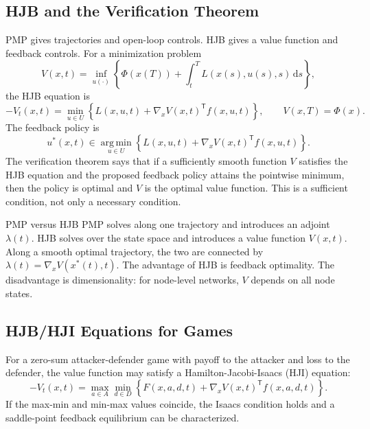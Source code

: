 \documentclass[11pt,a4paper]{article}
\newcommand{\dd}{\,\mathrm{d}}
\newcommand{\argmin}{\operatorname*{arg\,min}}
\newcommand{\T}{\mathsf{T}}
\begin{document}
\subsection{HJB and the Verification Theorem}

PMP gives trajectories and open-loop controls. HJB gives a value function and feedback controls. For a minimization problem
\begin{equation}
  V(x,t)=\inf_{u(\cdot)}\left\{\Phi(x(T))+\int_t^T L(x(s),u(s),s)\dd s\right\},
\end{equation}
the HJB equation is
\begin{equation}
  -V_t(x,t)=\min_{u\in U}\left\{L(x,u,t)+\nabla_x V(x,t)^{\T}f(x,u,t)\right\},
  \qquad V(x,T)=\Phi(x).
  \label{eq:hjb-control}
\end{equation}
The feedback policy is
\begin{equation}
  u^*(x,t)\in\argmin_{u\in U}\left\{L(x,u,t)+\nabla_x V(x,t)^{\T}f(x,u,t)\right\}.
\end{equation}
The verification theorem says that if a sufficiently smooth function $V$ satisfies the HJB equation and the proposed feedback policy attains the pointwise minimum, then the policy is optimal and $V$ is the optimal value function. This is a sufficient condition, not only a necessary condition.

\begin{definitionbox}{PMP versus HJB}
PMP solves along one trajectory and introduces an adjoint $\lambda(t)$. HJB solves over the state space and introduces a value function $V(x,t)$. Along a smooth optimal trajectory, the two are connected by $\lambda(t)=\nabla_x V(x^*(t),t)$. The advantage of HJB is feedback optimality. The disadvantage is dimensionality: for node-level networks, $V$ depends on all node states.
\end{definitionbox}

\subsection{HJB/HJI Equations for Games}

For a zero-sum attacker-defender game with payoff to the attacker and loss to the defender, the value function may satisfy a Hamilton-Jacobi-Isaacs (HJI) equation:
\begin{equation}
  -V_t(x,t)=\max_{a\in A}\min_{d\in D}\left\{F(x,a,d,t)+\nabla_xV(x,t)^{\T}f(x,a,d,t)\right\}.
  \label{eq:hji}
\end{equation}
If the max-min and min-max values coincide, the Isaacs condition holds and a saddle-point feedback equilibrium can be characterized.
\end{document}

